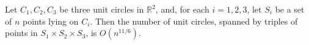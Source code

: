 \begin{theorem}
	Let $C_1,C_2,C_3$ be three unit circles in $\mathbb{R}^2$, and, for each
	$i=1,2,3$, let $S_i$ be a set of $n$ points lying on $C_i$. Then the number of
	unit circles, spanned by triples of points in $S_1 \times S_2 \times S_3$, is
	$O(n^{11/6})$.
\end{theorem}
